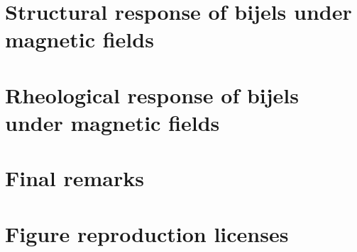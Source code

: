 \documentclass{udthesis}
\begin{document}
\chapter{Structural response of bijels under magnetic fields}
\label{chapter:aim2}


\chapter{Rheological response of bijels under magnetic fields}
\label{chapter:aim3}


\chapter{Final remarks}
\label{chapter:final_remarks}


\newpage

\chapter{Figure reproduction licenses}


\newpage



\end{document}
